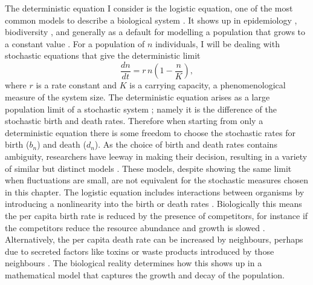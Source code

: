The deterministic equation I consider is the logistic equation, one of the most common models to describe a biological system \cite{Greenhalgh1990,Ovaskainen2010,Assaf2010,Allen2003,Norden1982,Newman2004,Allen2005,Fujita1953,Nasell2001}. 
It shows up in epidemiology \cite{Assaf2009,others?}, biodiversity \cite{Hubbell2001?,others?}, and generally as a default for modelling a population that grows to a constant value \cite{bacteria OD, eg}. %
For a population of $n$ individuals, I will be dealing with stochastic equations that give the deterministic limit
\begin{equation}
\frac{dn}{dt} = r\,n\left(1-\frac{n}{K}\right),
\label{logistic}
\end{equation}
where $r$ is a rate constant and $K$ is a carrying capacity, a phenomenological measure of the system size. 
The deterministic equation arises as a large population limit of a stochastic system \cite{Nisbet1982,Gardiner2004,Rouzine2001}; namely it is the difference of the stochastic birth and death rates. 
Therefore when starting from only a deterministic equation there is some freedom to choose the stochastic rates for birth ($b_n$) and death ($d_n$). 
As the choice of birth and death rates contains ambiguity, researchers have leeway in making their decision, resulting in a variety of similar but distinct models \cite{Greenhalgh1990,Ovaskainen2010,Assaf2010,Allen2003,Norden1982,Newman2004,Allen2005,Fujita1953,Nasell2001}. 
These models, despite showing the same limit when fluctuations are small, are not equivalent for the stochastic measures chosen in this chapter. 
%
The logistic equation includes interactions between organisms by introducing a nonlinearity into the birth or death rates \cite{Greenhalgh1990,Ovaskainen2010,Assaf2010,Allen2003,Norden1982,Newman2004,Allen2005,Fujita1953,Nasell2001}. 
Biologically this means the per capita birth rate is reduced by the presence of competitors, for instance if the competitors reduce the resource abundance and growth is slowed \cite{Nadell2008,Vulic2001}. 
Alternatively, the per capita death rate can be increased by neighbours, perhaps due to secreted factors like toxins or waste products introduced by those neighbours \cite{Greenhalgh1990,VanMelderen2009,Rankin2012}. 
The biological reality determines how this shows up in a mathematical model that captures the growth and decay of the population. 
